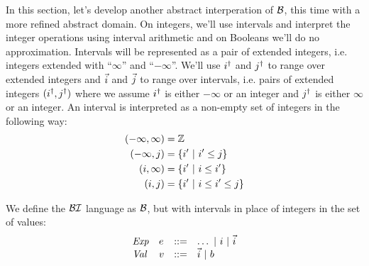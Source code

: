 In this section, let's develop another abstract interperation of
$\mathcal{B}$, this time with a more refined abstract domain.  On
integers, we'll use intervals and interpret the integer operations
using interval arithmetic and on Booleans we'll do no approximation.
Intervals will be represented as a pair of extended integers,
i.e. integers extended with ``$\infty$'' and ``$-\infty$''.  We'll use
$i^\dagger$ and $j^\dagger$ to range over extended integers and $\vec{i}$
and $\vec{j}$ to range over intervals, i.e. pairs of extended integers
$(i^\dagger,j^\dagger)$ where we assume $i^\dagger$ is either $-\infty$ or an
integer and $j^\dagger$ is either $\infty$ or an integer.  An interval
is interpreted as a non-empty set of integers in the following way:
\begin{align*}
(-\infty,\infty) &= \mathbb{Z}\\
(-\infty,j) &= \{ i'\ |\ i' \leq j \}\\
(i,\infty) &= \{ i'\ |\ i \leq i' \}\\
(i,j) &= \{ i'\ |\ i \leq i' \leq j \}
\end{align*}

We define the $\mathcal{BI}$ language as $\mathcal{B}$, but with intervals in place
of integers in the set of values:
\[
\begin{array}{llcl}
\mathit{Exp}  & e & ::= & \dots\ |\ i\ |\ \vec{i}\\
\mathit{Val}  & v & ::= & \vec{i}\ |\ b
\end{array}
\]

